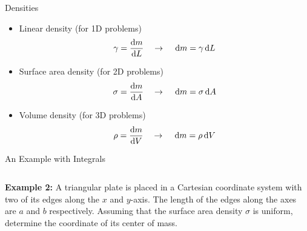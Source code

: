 \documentclass[12pt,compress,aspectratio=169]{beamer}
\begin{document}
\begin{frame}{Densities}
  \begin{itemize}
  \item Linear density (for 1D problems)
    {\Large
      \begin{displaymath}
        \gamma = \diff mL\quad\rightarrow\quad \dl m =\gamma\dl L
      \end{displaymath}
    }
  \item Surface area density (for 2D problems)
    {\Large
      \begin{displaymath}
        \sigma=\diff mA\quad\rightarrow\quad \dl m =\sigma\dl A
      \end{displaymath}
    }
  \item Volume density (for 3D problems)
    {\Large
      \begin{displaymath}
        \rho=\diff mV\quad\rightarrow\quad \dl m =\rho\dl V
      \end{displaymath}
    }
  \end{itemize}
\end{frame}


\begin{frame}{An Example with Integrals}
  \begin{columns}
    \textbf{Example 2:} A triangular plate is placed in a Cartesian coordinate
    system with two of its edges along the $x$ and $y$-axis. The length of the
    edges along the axes are $a$ and $b$ respectively. Assuming that the
    surface area density $\sigma$ is uniform, determine the coordinate of its
    center of mass.

  \end{columns}
\end{frame}
\end{document}
